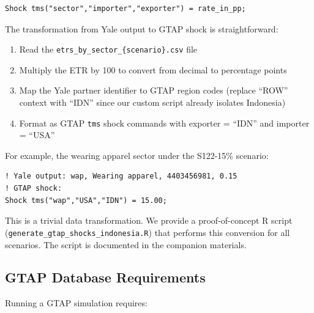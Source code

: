 \documentclass[12pt,a4paper]{article}
\begin{document}
\begin{verbatim}
Shock tms("sector","importer","exporter") = rate_in_pp;
\end{verbatim}

\noindent The transformation from Yale output to GTAP shock is straightforward:

\begin{enumerate}
    \item Read the \texttt{etrs\_by\_sector\_\{scenario\}.csv} file
    \item Multiply the ETR by 100 to convert from decimal to percentage points
    \item Map the Yale partner identifier to GTAP region codes (replace ``ROW'' context with ``IDN'' since our custom script already isolates Indonesia)
    \item Format as GTAP \texttt{tms} shock commands with exporter = ``IDN'' and importer = ``USA''
\end{enumerate}

\noindent For example, the wearing apparel sector under the S122-15\% scenario:
\begin{verbatim}
! Yale output: wap, Wearing apparel, 4403456981, 0.15
! GTAP shock:
Shock tms("wap","USA","IDN") = 15.00;
\end{verbatim}

This is a trivial data transformation. We provide a proof-of-concept R script (\texttt{generate\_gtap\_shocks\_indonesia.R}) that performs this conversion for all scenarios. The script is documented in the companion materials.

\subsection{GTAP Database Requirements}

Running a GTAP simulation requires:
\end{document}
